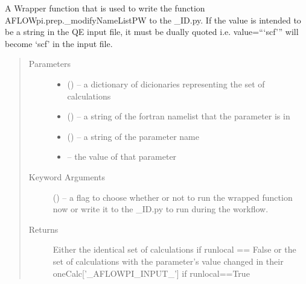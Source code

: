 \documentclass[letterpaper,10pt,english]{sphinxmanual}
\begin{document}
\begin{fulllineitems}
\label{\detokenize{prep:prep.modifyNamelistPW}}
A Wrapper function that is used to write the function AFLOWpi.prep.\_modifyNameListPW
to the \_ID.py. If the value is intended to be a string in the QE input file, it must
be dually quoted i.e. value=```scf''' will become `scf' in the input file.
\begin{quote}\begin{description}
\item[{Parameters}] \leavevmode\begin{itemize}
\item {} 
 () -- a dictionary of dicionaries representing the set of calculations

\item {} 
 () -- a string of the fortran namelist that the parameter is in

\item {} 
 () -- a string of the parameter name

\item {} 
 -- the value of that parameter

\end{itemize}

\item[{Keyword Arguments}] \leavevmode
{} () -- a flag to choose whether or not to run the wrapped function now
or write it to the \_ID.py to run during the workflow.

\item[{Returns}] \leavevmode
Either the identical set of calculations if runlocal == False or the set of
calculations with the parameter's value changed in their oneCalc{[}'\_AFLOWPI\_INPUT\_'{]}
if runlocal==True

\end{description}\end{quote}

\end{fulllineitems}

\end{document}

